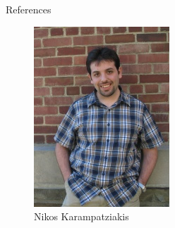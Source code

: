\documentclass{beamer}
\begin{document}
\begin{frame}{References}
\begin{figure}
\begin{minipage}[t]{.2\paperwidth}
        \includegraphics[width=\textwidth]{res/Nikos Karampatziakis.jpg}
        \caption{Nikos Karampatziakis}
    \end{minipage}
\end{figure}

\end{frame}
\end{document}
